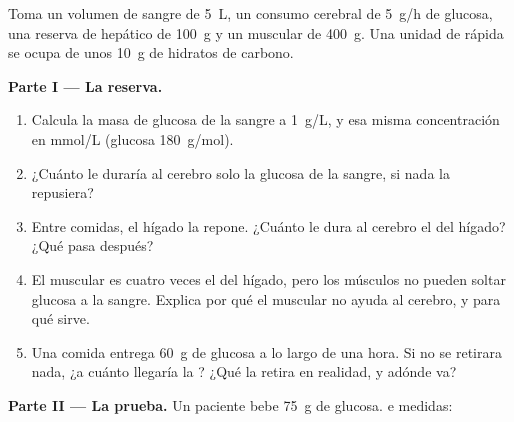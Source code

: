 \begin{problem}
\label{pb:g12:glucose-and-diabetes:1}
Toma un volumen de sangre de \qty{5}{L}, un consumo cerebral de
\qty{5}{g/h} de glucosa, una reserva de  hepático de
\qty{100}{g} y un  muscular de \qty{400}{g}. Una unidad de
 rápida se ocupa de unos \qty{10}{g} de hidratos de carbono.

\medskip
\noindent\textbf{Parte I --- La reserva.}
\begin{enumerate}
  \item Calcula la masa de glucosa de la sangre a \qty{1}{g/L}, y esa
        misma concentración en \unit{mmol/L} (glucosa
        \qty{180}{g/mol}).
  \item ¿Cuánto le duraría al cerebro solo la glucosa de la sangre, si
        nada la repusiera?
  \item Entre comidas, el hígado la repone. ¿Cuánto le dura al cerebro
        el  del hígado? ¿Qué pasa después?
  \item El  muscular es cuatro veces el del hígado, pero los
        músculos no pueden soltar glucosa a la sangre. Explica por qué
        el  muscular no ayuda al cerebro, y para qué sirve.
  \item Una comida entrega \qty{60}{g} de glucosa a lo largo de una
        hora. Si no se retirara nada, ¿a cuánto llegaría la ?
        ¿Qué la retira en realidad, y adónde va?
\end{enumerate}

\medskip
\noindent\textbf{Parte II --- La prueba.}
Un paciente bebe \qty{75}{g} de glucosa.  e  medidas:


\end{problem}
